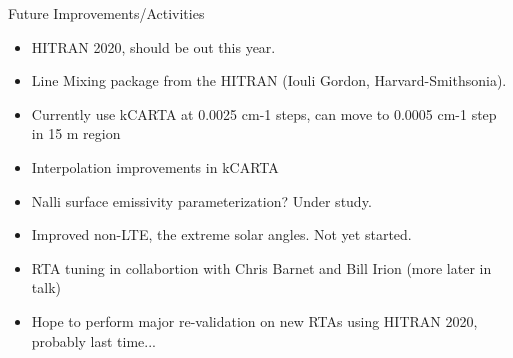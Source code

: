 \documentclass[10pt,t]{beamer}
\begin{document}
\begin{frame}{Future Improvements/Activities}

  \begin{itemize}
  \item HITRAN 2020, should be out this year.
  \item Line Mixing package from the HITRAN (Iouli Gordon, Harvard-Smithsonia).
  \item Currently use kCARTA at 0.0025 cm-1 steps, can move to 0.0005 cm-1 step in 15 \um m region
  \item Interpolation improvements in kCARTA
  \item Nalli surface emissivity parameterization?  Under study.
  \item Improved non-LTE, the extreme solar angles.  Not yet started.
  \item RTA tuning in collabortion with Chris Barnet and Bill Irion (more later in talk)
  \item Hope to perform major re-validation on new RTAs using HITRAN 2020, probably last time...
  \end{itemize}
\end{frame}
\end{document}
